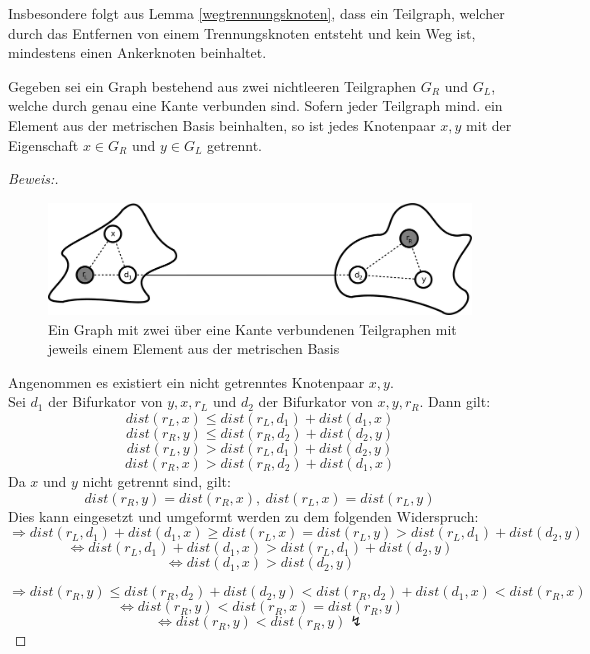 \begin{bem}
Insbesondere folgt aus Lemma \ref{wegtrennungsknoten}, dass ein Teilgraph, welcher durch das Entfernen von einem Trennungsknoten entsteht und kein Weg ist, mindestens einen Ankerknoten beinhaltet.
\end{bem}
\begin{lem}
\label{first_theorem}
Gegeben sei ein Graph bestehend aus zwei nichtleeren Teilgraphen $G_R$ und $G_L$, welche durch genau eine Kante verbunden sind. Sofern jeder Teilgraph mind. ein Element aus der metrischen Basis beinhalten, so ist jedes Knotenpaar $x,y$ mit der Eigenschaft $x \in G_R$ und $y \in G_L$ getrennt.
\end{lem}
\begin{proof}[Beweis:] ~
\begin{figure}[h!]
		\centering 		 
  \includegraphics[width=420pt]{bilder/bew5.pdf}
	\caption{Ein Graph mit zwei über eine Kante verbundenen Teilgraphen mit jeweils einem Element aus der metrischen Basis}
  	 \end{figure}
  Angenommen es existiert ein nicht getrenntes Knotenpaar $x,y$.\\Sei $d_1$ der Bifurkator von $y,x,r_L$ und $d_2$ der Bifurkator von $x,y,r_R$. Dann gilt: $$dist(r_L,x) \leq dist(r_L,d_1)+ dist(d_1,x)$$ $$dist(r_R,y) \leq dist(r_R,d_2)+ dist(d_2,y)$$ $$dist(r_L,y) > dist(r_L,d_1)+ dist(d_2,y)$$ $$dist(r_R,x) > dist(r_R,d_2)+ dist(d_1,x)$$
  Da $x$ und $y$ nicht getrennt sind, gilt:
   $$dist(r_R,y) =dist(r_R,x),\: dist(r_L,x) = dist(r_L,y)$$ Dies kann eingesetzt und umgeformt werden zu dem folgenden Widerspruch:
  $$\Rightarrow dist(r_L,d_1)+ dist(d_1,x) \geq dist(r_L,x) = dist(r_L,y)> dist(r_L,d_1)+ dist(d_2,y)$$
  $$\Leftrightarrow dist(r_L,d_1)+ dist(d_1,x) > dist(r_L,d_1)+ dist(d_2,y)$$
  $$\Leftrightarrow dist(d_1,x) >  dist(d_2,y)$$
  
  $$\Rightarrow dist(r_R,y) \leq dist(r_R,d_2)+ dist(d_2,y) < dist(r_R,d_2) + dist(d_1,x) < dist(r_R,x)$$
  $$\Leftrightarrow dist(r_R,y) < dist(r_R,x) = dist(r_R,y)$$
  $$\Leftrightarrow dist(r_R,y) < dist(r_R,y) \lightning $$  
  \end{proof}
